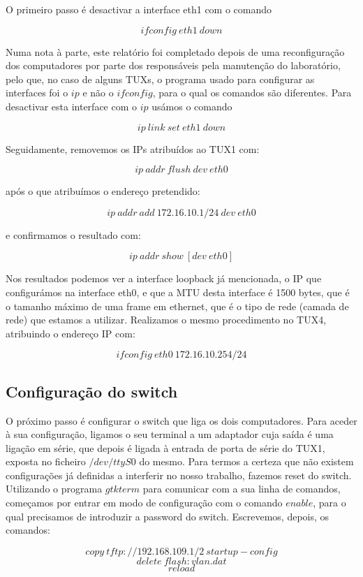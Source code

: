 \documentclass[a4paper,11pt,titlepage]{article}
\begin{document}
O primeiro passo é desactivar a interface eth1 com o comando

$$ifconfig\ eth1\ down$$

Numa nota à parte, este relatório foi completado depois de uma
reconfiguração dos computadores por parte dos responsáveis pela manutenção do
laboratório, pelo que, no caso de alguns TUXs, o programa usado para configurar
as interfaces foi o $ip$ e não o $ifconfig$, para o qual os comandos são
diferentes. Para desactivar esta interface com o $ip$ usámos o comando

$$ip\ link\ set\ eth1\ down$$

Seguidamente, removemos os IPs atribuídos ao TUX1 com:

$$ip\ addr\ flush\ dev\ eth0$$

após o que atribuímos o endereço pretendido:

$$ip\ addr\ add\ 172.16.10.1/24\ dev\ eth0$$

e confirmamos o resultado com:

$$ip\ addr\ show\ [dev\ eth0]$$

Nos resultados podemos ver a interface loopback já mencionada, o IP que
configurámos na interface eth0, e que a MTU desta interface é 1500 bytes, que é
o tamanho máximo de uma frame em ethernet, que é o tipo de rede (camada de
rede) que estamos a utilizar.
Realizamos o mesmo procedimento no TUX4, atribuindo o endereço IP com:

$$ifconfig\ eth0\ 172.16.10.254/24$$

\subsection*{Configuração do switch }

O próximo passo é configurar o switch que liga os dois computadores.  Para
aceder à sua configuração, ligamos o seu terminal a um adaptador cuja saída é
uma ligação em série, que depois é ligada à entrada de porta de série do TUX1,
exposta no ficheiro $/dev/ttyS0$ do mesmo.
Para termos a certeza que não existem configurações já definidas a interferir no nosso trabalho, fazemos reset do switch. Utilizando o programa $gtkterm$ para
comunicar com a sua linha de comandos, começamos por entrar em modo de
configuração com o comando $enable$, para o qual precisamos de introduzir a
password do switch. Escrevemos, depois, os comandos:

$$copy\ tftp://192.168.109.1/2\ startup-config$$
$$delete\ flash:vlan.dat$$
$$reload$$
\end{document}
